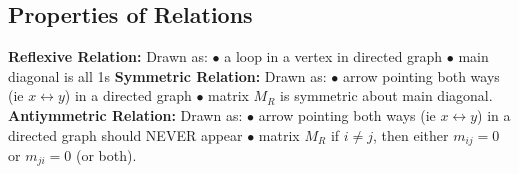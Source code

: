 \documentclass{article}
\begin{document}
\subsection{Properties of Relations}
\textbf{Reflexive Relation:}
\newline
\newline
{}
\newline 
\newline
Drawn as:
\newline
$\bullet $ a loop in a vertex in directed graph
\newline
$\bullet $ main diagonal is all 1s
\newline 
{}
\newline
\newline
\textbf{Symmetric Relation:}
\newline
\newline
{}
\newline 
\newline
Drawn as:
\newline
$\bullet $ arrow pointing both ways (ie $x \leftrightarrow y$) in a directed graph
\newline
$\bullet $ matrix $M_R$ is symmetric about main diagonal. 
\newline 
{}
\newline
\newline
\textbf{Antiymmetric Relation:}
\newline
\newline
{}
\newline 
\newline
Drawn as:
\newline
$\bullet $ arrow pointing both ways (ie $x \leftrightarrow y$) in a directed graph should NEVER appear
\newline
$\bullet $ matrix $M_R$ if $i \not = j$, then either $m_{ij} = 0$ or $m_{ji} = 0$ (or both).
\newline 
{}
\newline
\newline
\end{document}
